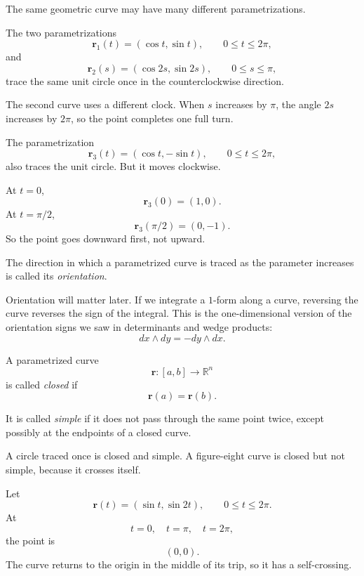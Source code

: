 The same geometric curve may have many different parametrizations.

\begin{example}
The two parametrizations
\[
    \mathbf r_1(t)=(\cos t,\sin t),
    \qquad 0\le t\le2\pi,
\]
and
\[
    \mathbf r_2(s)=(\cos 2s,\sin 2s),
    \qquad 0\le s\le\pi,
\]
trace the same unit circle once in the counterclockwise direction.

The second curve uses a different clock.  When \(s\) increases by \(\pi\), the angle
\(2s\) increases by \(2\pi\), so the point completes one full turn.
\end{example}

\begin{example}
The parametrization
\[
    \mathbf r_3(t)=(\cos t,-\sin t),
    \qquad 0\le t\le2\pi,
\]
also traces the unit circle.  But it moves clockwise.

At \(t=0\),
\[
    \mathbf r_3(0)=(1,0).
\]
At \(t=\pi/2\),
\[
    \mathbf r_3(\pi/2)=(0,-1).
\]
So the point goes downward first, not upward.
\end{example}

\begin{definition}
The direction in which a parametrized curve is traced as the parameter increases is
called its \emph{orientation}.
\end{definition}

Orientation will matter later.  If we integrate a \(1\)-form along a curve, reversing the
curve reverses the sign of the integral.  This is the one-dimensional version of the
orientation signs we saw in determinants and wedge products:
\[
    dx\wedge dy=-dy\wedge dx.
\]

\begin{definition}
A parametrized curve
\[
    \mathbf r:[a,b]\to\mathbb R^n
\]
is called \emph{closed} if
\[
    \mathbf r(a)=\mathbf r(b).
\]

It is called \emph{simple} if it does not pass through the same point twice, except
possibly at the endpoints of a closed curve.
\end{definition}

A circle traced once is closed and simple.  A figure-eight curve is closed but not simple,
because it crosses itself.

\begin{example}
Let
\[
    \mathbf r(t)=(\sin t,\sin 2t),
    \qquad 0\le t\le2\pi.
\]
At
\[
    t=0,\quad t=\pi,\quad t=2\pi,
\]
the point is
\[
    (0,0).
\]
The curve returns to the origin in the middle of its trip, so it has a self-crossing.
\end{example}


